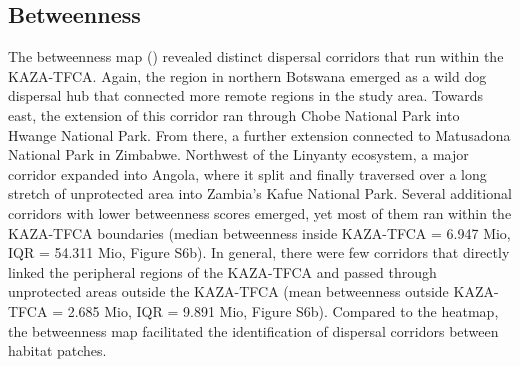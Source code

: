 \documentclass[abstract=on,10pt,a4paper,bibliography=totocnumbered]{article}
\begin{document}
\subsection{Betweenness}
The betweenness map () revealed distinct dispersal corridors
that run within the KAZA-TFCA. Again, the region in northern Botswana emerged as
a wild dog dispersal hub that connected more remote regions in the study area.
Towards east, the extension of this corridor ran through Chobe National Park
into Hwange National Park. From there, a further extension connected to
Matusadona National Park in Zimbabwe. Northwest of the Linyanty ecosystem, a
major corridor expanded into Angola, where it split and finally traversed
over a long stretch of unprotected area into Zambia's Kafue National Park.
Several additional corridors with lower betweenness scores emerged, yet most of
them ran within the KAZA-TFCA boundaries (median betweenness inside KAZA-TFCA =
6.947 Mio, IQR = 54.311 Mio, Figure S6b). In general, there were few corridors
that directly linked the peripheral regions of the KAZA-TFCA and passed through
unprotected areas outside the KAZA-TFCA (mean betweenness outside KAZA-TFCA =
2.685 Mio, IQR = 9.891 Mio, Figure S6b). Compared to the heatmap, the
betweenness map facilitated the identification of dispersal corridors between
habitat patches.

\end{document}
